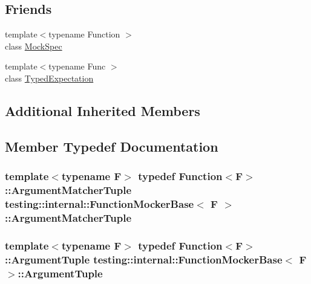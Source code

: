 \subsection*{Friends}
\begin{DoxyCompactItemize}
\item 
{\footnotesize template$<$typename Function $>$ }\\class \hyperlink{classtesting_1_1internal_1_1_function_mocker_base_ae72aeee91c93e8ae5e1ed7f726a766b2}{Mock\+Spec}
\item 
{\footnotesize template$<$typename Func $>$ }\\class \hyperlink{classtesting_1_1internal_1_1_function_mocker_base_a4f17de55396a8ef740d5ad2b1380a851}{Typed\+Expectation}
\end{DoxyCompactItemize}
\subsection*{Additional Inherited Members}


\subsection{Member Typedef Documentation}
\subsubsection[{\texorpdfstring{Argument\+Matcher\+Tuple}{ArgumentMatcherTuple}}]{\setlength{\rightskip}{0pt plus 5cm}template$<$typename F$>$ typedef {\bf Function}$<$F$>$\+::{\bf Argument\+Matcher\+Tuple} {\bf testing\+::internal\+::\+Function\+Mocker\+Base}$<$ F $>$\+::{\bf Argument\+Matcher\+Tuple}}\hypertarget{classtesting_1_1internal_1_1_function_mocker_base_ab790bcb1dcf57fa6659365386723ae5a}{}\label{classtesting_1_1internal_1_1_function_mocker_base_ab790bcb1dcf57fa6659365386723ae5a}
\subsubsection[{\texorpdfstring{Argument\+Tuple}{ArgumentTuple}}]{\setlength{\rightskip}{0pt plus 5cm}template$<$typename F$>$ typedef {\bf Function}$<$F$>$\+::{\bf Argument\+Tuple} {\bf testing\+::internal\+::\+Function\+Mocker\+Base}$<$ F $>$\+::{\bf Argument\+Tuple}}\hypertarget{classtesting_1_1internal_1_1_function_mocker_base_a336432a07e544af4ffb8103603471ca3}{}\label{classtesting_1_1internal_1_1_function_mocker_base_a336432a07e544af4ffb8103603471ca3}
